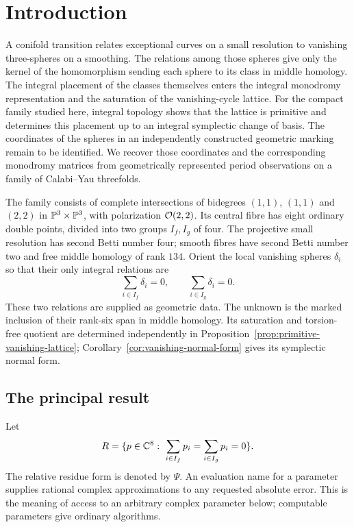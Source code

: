 \section{Introduction}
\label{sec:introduction}

A conifold transition relates exceptional curves on a small
resolution to vanishing three-spheres on a smoothing.
The relations among those spheres give only the kernel of the
homomorphism sending each sphere to its class in middle homology.
The integral placement of the classes themselves enters the
integral monodromy representation and the saturation of the
vanishing-cycle lattice. For the compact family studied here,
integral topology shows that the lattice is primitive and
determines this placement up to an integral symplectic change
of basis. The coordinates of the spheres in an independently
constructed geometric marking remain to be identified.
We recover those coordinates and the corresponding monodromy
matrices from geometrically represented period observations
on a family of Calabi--Yau threefolds.

The family consists of complete intersections of bidegrees
$(1,1)$, $(1,1)$ and $(2,2)$ in
$\mathbb P^3\times\mathbb P^3$, with polarization $\mathcal O(2,2)$.
Its central fibre has eight ordinary double points, divided
into two groups $I_f,I_g$ of four. The projective small
resolution has second Betti number four; smooth fibres
have second Betti number two and free middle homology
of rank $134$. Orient the local vanishing spheres
$\delta_i$ so that their only integral relations are
\begin{equation}\label{eq:intro-relations}
 \sum_{i\in I_f}\delta_i=0,\qquad
 \sum_{i\in I_g}\delta_i=0.
\end{equation}
These two relations are supplied as geometric data.
The unknown is the marked inclusion of their rank-six
span in middle homology. Its saturation and torsion-free
quotient are determined independently in
Proposition~\ref{prop:primitive-vanishing-lattice};
Corollary~\ref{cor:vanishing-normal-form} gives its symplectic
normal form.

\subsection{The principal result}

Let
\[
 R=\{p\in\mathbb C^8:\ \sum_{i\in I_f}p_i=
                       \sum_{i\in I_g}p_i=0\}.
\]
The relative residue form is denoted by $\Psi$.
An evaluation name for a parameter supplies rational
complex approximations to any requested absolute error.
This is the meaning of access to an arbitrary complex
parameter below; computable parameters give ordinary
algorithms.

